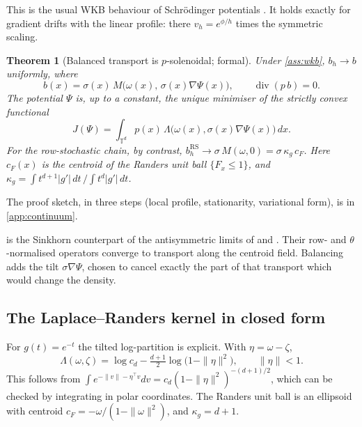 \documentclass{article}
\theoremstyle{plain}
\newtheorem{theorem}{Theorem}[section]
\theoremstyle{definition}
\theoremstyle{remark}
\newcommand{\T}{\mathbb{T}}
\newcommand{\1}{\mathbf{1}}
\newcommand{\dv}{\operatorname{div}}
\newcommand{\RS}{\operatorname{RS}}
\begin{document}
This is the usual WKB behaviour of Schr\"odinger potentials
\citep{leonard2014survey}. It holds exactly for gradient drifts with the
linear profile: there $v_h=e^{\phi/h}$ times the symmetric scaling.

\begin{theorem}[Balanced transport is $p$-solenoidal; formal]
  \label{thm:continuum}
  Under \cref{ass:wkb}, $b_h\to b$ uniformly, where
  \begin{equation}
    b(x)=\sigma(x)\,M\big(\omega(x),\,\sigma(x)\nabla\Psi(x)\big),
    \qquad \dv(p\,b)=0 .
    \label{eq:b}
  \end{equation}
  The potential $\Psi$ is, up to a constant, the unique minimiser of the
  strictly convex functional
  \begin{equation}
    J(\Psi)=\int_{\T^d}p(x)\,\Lambda\big(\omega(x),\sigma(x)\nabla\Psi(x)\big)\,dx .
    \label{eq:J}
  \end{equation}
  For the row-stochastic chain, by contrast,
  $b^{\RS}_h\to\sigma\,M(\omega,0)=\sigma\,\kappa_g\,c_F$. Here $c_F(x)$ is
  the centroid of the Randers unit ball $\{F_x\le1\}$, and
  $\kappa_g=\int t^{d+1}|g'|\,dt\,/\int t^d|g'|\,dt$.
\end{theorem}

The proof sketch, in three steps (local profile, stationarity,
variational form), is in \cref{app:continuum}.

 is the Sinkhorn counterpart of the antisymmetric
limits of \citet{perraultjoncas2011directed} and
\citet{debaussart2026finslerian}. Their row- and $\theta$-normalised
operators converge to transport along the centroid field. Balancing adds
the tilt $\sigma\nabla\Psi$, chosen to cancel exactly the part of that
transport which would change the density.

\subsection{The Laplace--Randers kernel in closed form}

For $g(t)=e^{-t}$ the tilted log-partition is explicit. With
$\eta=\omega-\zeta$,
\begin{equation}
  \Lambda(\omega,\zeta)=\log c_d-\tfrac{d+1}{2}\log\!\big(1-\|\eta\|^2\big),
  \qquad \|\eta\|<1 .
  \label{eq:laplace}
\end{equation}
This follows from $\int e^{-\|v\|-\eta^\top v}dv=c_d(1-\|\eta\|^2)^{-(d+1)/2}$,
which can be checked by integrating in polar coordinates. The Randers unit
ball is an ellipsoid with centroid $c_F=-\omega/(1-\|\omega\|^2)$, and
$\kappa_g=d+1$.
\end{document}
